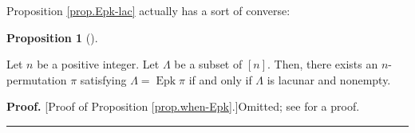 \documentclass[numbers=enddot,12pt,final,onecolumn,notitlepage]{scrartcl}%
\theoremstyle{definition}
\newtheorem{prop}[theo]{Proposition}
\newenvironment{proposition}[1][]
{\begin{prop}[#1]\begin{leftbar}}
{\end{leftbar}\end{prop}}
\newenvironment{proof}[1][Proof]{\noindent\textbf{#1.} }{\ \rule{0.5em}{0.5em}}
\newenvironment{vershort}{}{}
\begin{document}
Proposition \ref{prop.Epk-lac} actually has a sort of converse:

\begin{proposition}
\label{prop.when-Epk}Let $n$ be a positive integer. Let $\Lambda$ be a subset
of $\left[  n\right]  $. Then, there exists an $n$-permutation $\pi$
satisfying $\Lambda=\operatorname*{Epk}\pi$ if and only if $\Lambda$ is
lacunar and nonempty.
\end{proposition}

\begin{vershort}


\begin{proof}
[Proof of Proposition \ref{prop.when-Epk}.]Omitted; see \cite{verlong} for a proof.
\end{proof}
\end{vershort}
\end{document}
